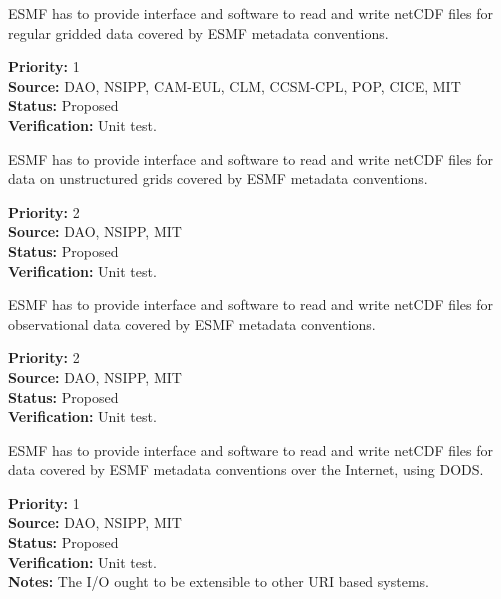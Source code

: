 
ESMF has to provide interface and software to read and write netCDF
files for regular gridded data covered by ESMF metadata conventions. 

\begin{reqlist}
{\bf Priority:} 1 \\
{\bf Source:} DAO, NSIPP, CAM-EUL, CLM, CCSM-CPL, POP, CICE, MIT \\
{\bf Status:} Proposed \\
{\bf Verification:} Unit test. \\
\end{reqlist}



ESMF has to provide interface and software to read and write netCDF
files for data on unstructured grids covered by ESMF metadata conventions. 

\begin{reqlist}
{\bf Priority:} 2 \\
{\bf Source:} DAO, NSIPP, MIT \\
{\bf Status:} Proposed \\
{\bf Verification:} Unit test. \\
\end{reqlist}



ESMF has to provide interface and software to read and write netCDF
files for observational data  covered by ESMF metadata conventions. 

\begin{reqlist}
{\bf Priority:} 2 \\
{\bf Source:} DAO, NSIPP, MIT \\
{\bf Status:} Proposed \\
{\bf Verification:} Unit test. \\
\end{reqlist}



ESMF has to provide interface and software to read and write netCDF
files for data covered by ESMF metadata conventions over the Internet, 
using DODS.

\begin{reqlist}
{\bf Priority:} 1 \\
{\bf Source:} DAO, NSIPP, MIT \\
{\bf Status:} Proposed \\
{\bf Verification:} Unit test. \\
{\bf Notes:} The I/O ought to be extensible to other URI based
systems. \\
\end{reqlist}

